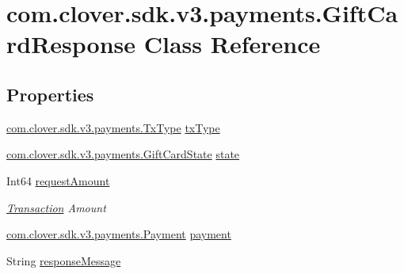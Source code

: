 \hypertarget{classcom_1_1clover_1_1sdk_1_1v3_1_1payments_1_1_gift_card_response}{}\section{com.\+clover.\+sdk.\+v3.\+payments.\+Gift\+Card\+Response Class Reference}
\label{classcom_1_1clover_1_1sdk_1_1v3_1_1payments_1_1_gift_card_response}
\subsection*{Properties}
\begin{DoxyCompactItemize}
\item 
\hyperlink{namespacecom_1_1clover_1_1sdk_1_1v3_1_1payments_ad4411d3ee4c0997584ff0df20764ba06}{com.\+clover.\+sdk.\+v3.\+payments.\+Tx\+Type} \hyperlink{classcom_1_1clover_1_1sdk_1_1v3_1_1payments_1_1_gift_card_response_aee1f7f1c4ee508658dd5b13cf897c640}{tx\+Type}
\item 
\hyperlink{namespacecom_1_1clover_1_1sdk_1_1v3_1_1payments_a67d9d7bce276d6e020d49ff3f322fce3}{com.\+clover.\+sdk.\+v3.\+payments.\+Gift\+Card\+State} \hyperlink{classcom_1_1clover_1_1sdk_1_1v3_1_1payments_1_1_gift_card_response_ad9a31e0ad1402c2f14d855f649c01d7e}{state}
\item 
Int64 \hyperlink{classcom_1_1clover_1_1sdk_1_1v3_1_1payments_1_1_gift_card_response_ac8eb07f2756ebc3b1f8d91ae48ced1d2}{request\+Amount}
\begin{DoxyCompactList}\small\item\em \hyperlink{classcom_1_1clover_1_1sdk_1_1v3_1_1payments_1_1_transaction}{Transaction} Amount \end{DoxyCompactList}\item 
\hyperlink{classcom_1_1clover_1_1sdk_1_1v3_1_1payments_1_1_payment}{com.\+clover.\+sdk.\+v3.\+payments.\+Payment} \hyperlink{classcom_1_1clover_1_1sdk_1_1v3_1_1payments_1_1_gift_card_response_ac1774b85e3fc551ed28fc1e56de81725}{payment}
\item 
String \hyperlink{classcom_1_1clover_1_1sdk_1_1v3_1_1payments_1_1_gift_card_response_a72628152a9f700a98a02502296ccc849}{response\+Message}

\end{DoxyCompactItemize}
